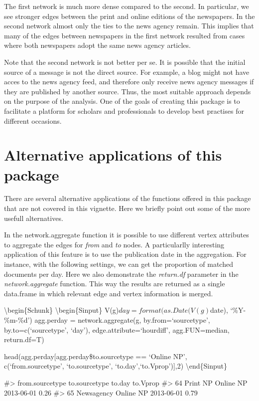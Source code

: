 The first network is much more dense compared to the second. In
particular, we see stronger edges between the print and online editions
of the newspapers. In the second network almost only the ties to the
news agency remain. This implies that many of the edges between
newspapers in the first network resulted from cases where both
newspapers adopt the same news agency articles.

Note that the second network is not better per se. It is possible that
the initial source of a message is not the direct source. For example, a
blog might not have acces to the news agency feed, and therefore only
receive news agency messages if they are published by another source.
Thus, the most suitable approach depends on the purpose of the analysis.
One of the goals of creating this package is to facilitate a platform
for scholars and professionals to develop best practises for different
occasions.

\section{Alternative applications of this package}

There are several alternative applications of the functions offered in
this package that are not covered in this vignette. Here we briefly
point out some of the more usefull alternatives.

In the network.aggregate function it is possible to use different vertex
attributes to aggregate the edges for \emph{from} and \emph{to} nodes. A
particularlly interesting application of this feature is to use the
publication date in the aggregation. For instance, with the following
settings, we can get the proportion of matched documents per day. Here
we also demonstrate the \emph{return.df} parameter in the
\emph{network.aggregate} function. This way the results are returned as
a single data.frame in which relevant edge and vertex information is
merged.

\textbackslash{}begin\{Schunk\} \textbackslash{}begin\{Sinput\}
V(g)\(day = format(as.Date(V(g)\)date), `\%Y-\%m-\%d') agg.perday =
network.aggregate(g, by.from=`sourcetype', by.to=c(`sourcetype', `day'),
edge.attribute=`hourdiff', agg.FUN=median, return.df=T)

head(agg.perday{[}agg.perday\$to.sourcetype == `Online NP',\\
c(`from.sourcetype', `to.sourcetype', `to.day',`to.Vprop'){]},2)
\textbackslash{}end\{Sinput\}

\begin{Soutput}
#>    from.sourcetype to.sourcetype     to.day to.Vprop
#> 64        Print NP     Online NP 2013-06-01     0.26
#> 65      Newsagency     Online NP 2013-06-01     0.79
\end{Soutput}

